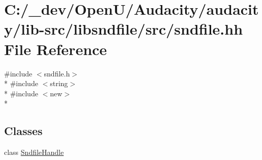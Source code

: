 \hypertarget{sndfile_8hh}{}\section{C\+:/\+\_\+dev/\+Open\+U/\+Audacity/audacity/lib-\/src/libsndfile/src/sndfile.hh File Reference}
\label{sndfile_8hh}
{\ttfamily \#include $<$sndfile.\+h$>$}\\*
{\ttfamily \#include $<$string$>$}\\*
{\ttfamily \#include $<$new$>$}\\*
\subsection*{Classes}
\begin{DoxyCompactItemize}
\item 
class \hyperlink{class_sndfile_handle}{Sndfile\+Handle}
\end{DoxyCompactItemize}
